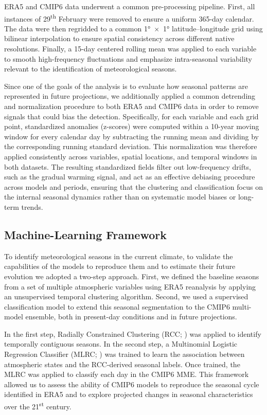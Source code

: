 ERA5 and CMIP6 data underwent a common pre-processing pipeline.
First, all instances of 29\textsuperscript{th} February were removed to ensure a uniform 365-day calendar.
The data were then regridded to a common 1°~$\times$~1° latitude–longitude grid using bilinear interpolation to ensure spatial consistency across different native resolutions.
Finally, a 15-day centered rolling mean was applied to each variable to smooth high-frequency fluctuations and emphasize intra-seasonal variability relevant to the identification of meteorological seasons.

Since one of the goals of the analysis is to evaluate how seasonal patterns are represented in future projections, we additionally applied a common detrending and normalization procedure to both ERA5 and CMIP6 data in order to remove signals that could bias the detection. Specifically, for each variable and each grid point, standardized anomalies (z-scores) were computed within a 10-year moving window for every calendar day by subtracting the running mean and dividing by the corresponding running standard deviation. This normalization was therefore applied consistently across variables, spatial locations, and temporal windows in both datasets. The resulting standardized fields filter out low-frequency drifts, such as the gradual warming signal, and act as an effective debiasing procedure across models and periods, ensuring that the clustering and classification focus on the internal seasonal dynamics rather than on systematic model biases or long-term trends.

\subsection{Machine-Learning Framework}

To identify meteorological seasons in the current climate, to validate the capabilities of the models to reproduce them and to estimate their future evolution we adopted a two-step approach.  
First, we defined the baseline seasons from a set of multiple atmospheric variables using ERA5 reanalysis by applying an unsupervised temporal clustering algorithm.  
Second, we used a supervised classification model to extend this seasonal segmentation to the CMIP6 multi-model ensemble, both in present-day conditions and in future projections.  

In the first step, Radially Constrained Clustering (RCC; \citet{cannon_defining_2005}) was applied to identify temporally contiguous seasons.  
In the second step, a Multinomial Logistic Regression Classifier (MLRC; \citet{hastie_elements_2009}) was trained to learn the association between atmospheric states and the RCC-derived seasonal labels.  
Once trained, the MLRC was applied to classify each day in the CMIP6 MME.  
This framework allowed us to assess the ability of CMIP6 models to reproduce the seasonal cycle identified in ERA5 and to explore projected changes in seasonal characteristics over the 21\textsuperscript{st} century.

